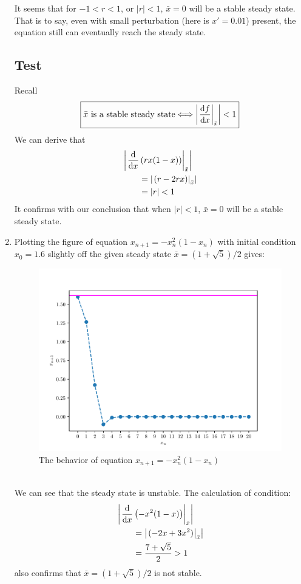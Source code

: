\begin{homeworkProblem}[2]
\begin{enumerate}
It seems that for $-1 < r < 1$, or $|r| < 1$, $\bar x = 0$ will be a stable
steady state. That is to say, even with small perturbation (here is $x' = 0.01$)
present, the equation still can eventually reach the steady state.

\segline

\subsection{Test}
Recall \[
    \boxed{
    \bar x \text{ is a stable steady state}
    \Longleftrightarrow
    \left| \left.\frac{\mathrm{d}f}{\mathrm{d}x}\right|_{\bar x} \right| < 1
    }
\]
We can derive that
\[
    \begin{aligned}
        &\left|\left.\frac{\mathrm{d}}{\mathrm{d}x} \left(rx(1-x)\right)\right|_{\bar x}\right|\\
        &\qquad = \left| \left.(r - 2rx)\right|_{\bar x} \right|\\
        &\qquad = |r| < 1
    \end{aligned}
\]
It confirms with our conclusion that when $|r| < 1$, $\bar x = 0$ will be a 
stable steady state.
\pagebreak
\item Plotting the figure of equation $x_{n+1} = -x_n^2(1-x_n)$ with initial 
condition $x_0 = 1.6$ slightly off the given steady state $\bar x = (1+ \sqrt{5}
)/2$ gives:
\begin{figure}
    \centering
    \caption{The behavior of equation $x_{n+1} = -x_n^2(1-x_n)$}
    \includegraphics[scale=0.6]{../fig/fig2(b)}
\end{figure}
\\
We can see that the steady state is unstable. The calculation of condition:
\[
    \begin{aligned}
        &\left|\left.\frac{\mathrm{d}}{\mathrm{d}x} \left(-x^2(1-x)\right)\right|_{\bar x}\right|\\
        &\qquad = \left| \left.(-2x + 3x^2)\right|_{\bar x} \right|\\
        &\qquad = \frac{7+\sqrt{5}}{2} > 1
    \end{aligned}
\]
also confirms that $\bar x = (1+\sqrt{5})/2$ is not stable.


\end{enumerate}
\end{homeworkProblem}
